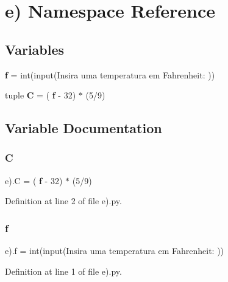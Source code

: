 \section{e) Namespace Reference}
\label{namespacee_08}
\subsection*{Variables}
\begin{DoxyCompactItemize}
\item 
\textbf{ f} = int(input(\textquotesingle{}Insira uma temperatura em Fahrenheit\+: \textquotesingle{}))
\item 
tuple \textbf{ C} = (\textbf{ f} -\/ 32) $\ast$ (5/9)
\end{DoxyCompactItemize}


\subsection{Variable Documentation}
\mbox{\label{namespacee_08_a624ef3aef4d2e293005275dca3280bbf}} 
\subsubsection{C}
{\footnotesize\ttfamily e).C = (\textbf{ f} -\/ 32) $\ast$ (5/9)}



Definition at line 2 of file e).\+py.

\mbox{\label{namespacee_08_a2fda074e9a1c05589916db8231d3d5d3}} 
\subsubsection{f}
{\footnotesize\ttfamily e).f = int(input(\textquotesingle{}Insira uma temperatura em Fahrenheit\+: \textquotesingle{}))}



Definition at line 1 of file e).\+py.


